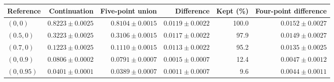 \begin{tabular}{@{}lrrrrr@{}}
\toprule
Reference & Continuation & Five-point union & Difference & Kept (\%) & Four-point difference \\
\midrule
$(0,0)$ & $0.8223\pm0.0025$ & $0.8104\pm0.0015$ & $0.0119\pm0.0022$ & 100.0 & $0.0152\pm0.0027$ \\
$(0.5,0)$ & $0.3223\pm0.0025$ & $0.3106\pm0.0015$ & $0.0117\pm0.0022$ & 97.9 & $0.0149\pm0.0027$ \\
$(0.7,0)$ & $0.1223\pm0.0025$ & $0.1110\pm0.0015$ & $0.0113\pm0.0022$ & 95.2 & $0.0135\pm0.0025$ \\
$(0,0.9)$ & $0.0806\pm0.0002$ & $0.0791\pm0.0007$ & $0.0015\pm0.0007$ & 12.4 & $0.0047\pm0.0012$ \\
$(0,0.95)$ & $0.0401\pm0.0001$ & $0.0389\pm0.0007$ & $0.0011\pm0.0007$ & 9.6 & $0.0044\pm0.0011$ \\
\bottomrule
\end{tabular}
